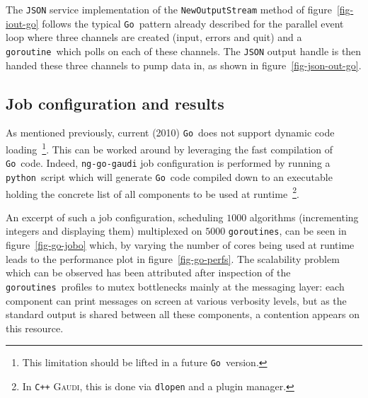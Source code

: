 \documentclass[a4paper]{jpconf}
\newcommand{\gaudi}{\textsc{Gaudi}}
\newcommand{\python}{\texttt{python}}
\newcommand{\golang}{\texttt{Go}}
\newcommand{\goroutine}{\texttt{goroutine}}
\newcommand{\goroutines}{\texttt{goroutines}}
\begin{document}
The \texttt{JSON} service implementation of the
\texttt{NewOutputStream} method of figure~\ref{fig-iout-go} follows
the typical \golang\ pattern already described for the parallel event
loop where three channels are created (input, errors and quit) and a
\goroutine\ which polls on each of these channels.
The \texttt{JSON} output handle is then handed these three channels to
pump data in, as shown in figure~\ref{fig-json-out-go}.

\subsection{Job configuration and results}
As mentioned previously, current (2010) \golang\ does not support
dynamic code loading~\footnote{This limitation should be lifted in a
future \golang\ version.}.
This can be worked around by leveraging the fast compilation of
\golang\ code.
Indeed, \texttt{ng-go-gaudi} job configuration is performed by running
a \python\ script which will generate \golang\ code compiled down to
an executable holding the concrete list of all components to be used
at runtime~\footnote{In \texttt{C++} \gaudi, this is done via
  \texttt{dlopen} and a plugin manager.}.

An excerpt of such a job configuration, scheduling $1000$ algorithms
(incrementing integers and displaying them) multiplexed on $5000$
\goroutines, can be seen in figure~\ref{fig-go-jobo} which, by varying
the number of cores being used at runtime leads to the performance
plot in figure~\ref{fig-go-perfs}. 
The scalability problem which can be observed has been attributed
after inspection of the \goroutines\ profiles to mutex bottlenecks
mainly at the messaging layer: each component can print messages on
screen at various verbosity levels, but as the standard output is
shared between all these components, a contention appears on this
resource.
\end{document}
